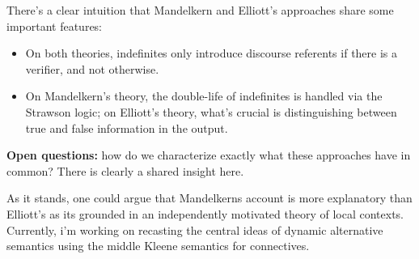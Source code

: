 \documentclass[nols,twoside,nofonts,nobib,nohyper]{tufte-handout}
\theoremstyle{observation}
\theoremstyle{theorem}
\theoremstyle{corollary}
\theoremstyle{definition}
\begin{document}
There's a clear intuition that Mandelkern and Elliott's approaches share some important features:

\begin{itemize}
    \item On both theories, indefinites only introduce discourse referents if there is a verifier, and not otherwise.

    \item On Mandelkern's theory, the double-life of indefinites is handled via the Strawson logic; on Elliott's theory, what's crucial is distinguishing between true and false information in the output.
\end{itemize}

\textbf{Open questions:} how do we characterize exactly what these approaches have in common? There is clearly a shared insight here.

As it stands, one could argue that Mandelkerns account is more explanatory than Elliott's as its grounded in an independently motivated theory of local contexts. Currently, i'm working on recasting the central ideas of dynamic alternative semantics using the middle Kleene semantics for connectives.

\printbibliography
\end{document}
